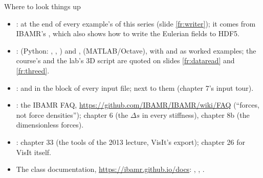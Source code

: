 \documentclass[aspectratio=169,11pt]{beamer}
\begin{document}
\begin{frame}{Where to look things up}
\label{fr:lookup}
\small
\begin{itemize}
  \item {}:  at the end of every example's  of this series (slide \ref{fr:writer}); it comes from IBAMR's , which also shows how to write the Eulerian fields to HDF5.
  \item {}:  (Python: , , ) and ,  (MATLAB/Octave), with  and  as worked examples; the course's  and the lab's 3D script are quoted on slides \ref{fr:dataread} and \ref{fr:threed}.
  \item {}:  and  in the  block of every input file;  next to them (chapter 7's input tour).
  \item {}: the IBAMR FAQ, \url{https://github.com/IBAMR/IBAMR/wiki/FAQ} (``forces, not force densities''); chapter 6 (the $\Delta s$ in every stiffness), chapter 8b (the dimensionless forces).
  \item {}: chapter 33 (the  tools of the 2013 lecture, VisIt's export); chapter 26 for VisIt itself.
  \item The class documentation, \url{https://ibamr.github.io/docs}: , , .
\end{itemize}
\end{frame}
\end{document}
